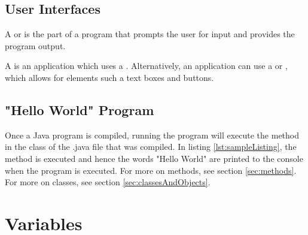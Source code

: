 \documentclass[11pt]{report}
\begin{document}
\subsection{User Interfaces}
\begin{defi}
    A  or  is the part of a program that prompts the user for input and provides the program output. 
\end{defi}
 A  is an application which uses a . Alternatively, an application can use a  or , which allows for elements such a text boxes and buttons.

\subsection{"Hello World" Program}
Once a Java program is compiled, running the program will execute the method in the class of the .java file that was compiled. In listing \ref{lst:sampleListing}, the  method is executed and hence the words "Hello World" are printed to the console when the program is executed.
For more on methods, see section \ref{sec:methods}. For more on classes, see section \ref{sec:classesAndObjects}.

\pagebreak
\section{Variables}
\end{document}
